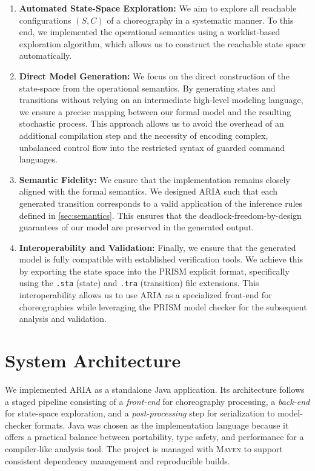 \begin{enumerate}
	\item \textbf{Automated State-Space Exploration:} We aim to explore all reachable configurations $(S,C)$ of a choreography in a systematic manner. To this end, we implemented the operational semantics using a worklist-based exploration algorithm, which allows us to construct the reachable state space automatically.
	
	\item \textbf{Direct Model Generation:} We focus on the direct construction of the state-space from the operational semantics. By generating states and transitions without relying on an intermediate high-level modeling language, we ensure a precise mapping between our formal model and the resulting stochastic process. This approach allows us to avoid the overhead of an additional compilation step and the necessity of encoding complex, unbalanced control flow into the restricted syntax of guarded command languages.
	
	\item \textbf{Semantic Fidelity:} We ensure that the implementation remains closely aligned with the formal semantics. We designed \textsc{ARIA} such that each generated transition corresponds to a valid application of the inference rules defined in \cref{sec:semantics}. This ensures that the deadlock-freedom-by-design guarantees of our model are preserved in the generated output.
	
	\item \textbf{Interoperability and Validation:} Finally, we ensure that the generated model is fully compatible with established verification tools. We achieve this by exporting the state space into the PRISM explicit format, specifically using the \texttt{.sta} (state) and \texttt{.tra} (transition) file extensions. This interoperability allows us to use \textsc{ARIA} as a specialized front-end for choreographies while leveraging the PRISM model checker for the subsequent analysis and validation.
\end{enumerate}

\section{System Architecture}
We implemented \textsc{ARIA} as a standalone Java application. Its architecture follows a staged pipeline consisting of a \textit{front-end} for choreography processing, a \textit{back-end} for state-space exploration, and a \textit{post-processing} step for serialization to model-checker formats. Java was chosen as the implementation language because it offers a practical balance between portability, type safety, and performance for a compiler-like analysis tool. The project is managed with \textsc{Maven} to support consistent dependency management and reproducible builds.

